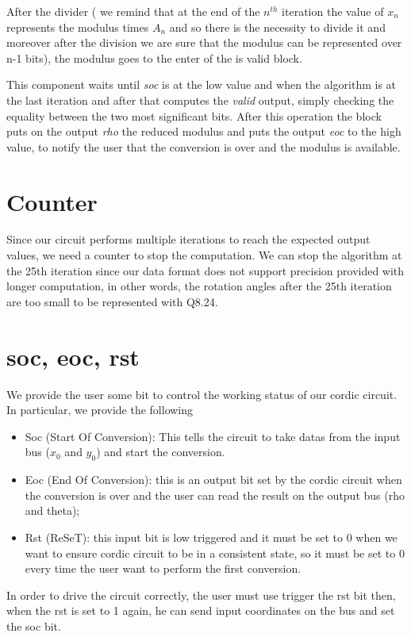 \documentclass[12pt,a4paper]{report}
\begin{document}
After the divider ( we remind that at the end of the $n^{th}$ iteration the value of $x_{n}$ represents the modulus times $A_{n}$ and so there is the necessity to divide it and moreover after the division we are sure that the modulus can be represented over n-1 bits), the modulus goes to the enter of the is \textunderscore valid block. 

This component waits until \emph{soc} is at the low value and when the algorithm is at the last iteration and after that computes the \emph{valid} output, simply checking the equality between the two most significant bits. After this operation the block puts on the output \emph{rho} the reduced modulus and puts the output \emph{eoc} to the high value, to notify the user that the conversion is over and the modulus is available.

\section{Counter}
Since our circuit performs multiple iterations to reach the expected output values, we need a counter to stop the computation.
We can stop the algorithm at the 25th iteration since our data format does not support precision provided with longer computation, in other words, the rotation angles after the 25th iteration are too small to be represented with Q8.24.

\section{soc, eoc, rst}
We provide the user some bit to control the working status of our cordic circuit. In particular, we provide the following
\begin{itemize}
	\item Soc (Start Of Conversion): This tells the circuit to take datas from the input bus ($x_{0}$ and $y_0$) and start the conversion.
	\item Eoc (End Of Conversion): this is an output bit set by the cordic circuit when the conversion is over and the user can read the result on the output bus (rho and theta);
	\item Rst (ReSeT): this input bit is low triggered and it must be set to 0 when we want to ensure cordic circuit to be in a consistent state, so it must be set to 0 every time the user want to perform the first conversion.
\end{itemize}

In order to drive the circuit correctly, the user must use trigger the rst bit then, when the rst is set to 1 again, he can send input coordinates on the bus and set the soc bit.
\end{document}
